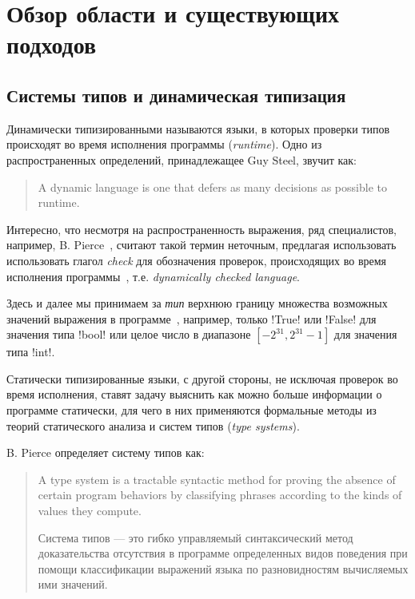 \chapter{Обзор области и существующих подходов}

\section{Системы типов и динамическая типизация}

Динамически типизированными называются языки, в которых проверки типов
происходят во время исполнения программы (\emph{runtime}). Одно из
распространенных определений, принадлежащее Guy Steel, звучит как:

\begin{quote}
  A dynamic language is one that defers as many decisions as possible to
  runtime.
\end{quote}

Интересно, что несмотря на распространенность выражения, ряд специалистов,
например, B. Pierce~\cite{Pierce2002}, считают такой термин неточным, предлагая
использовать использовать глагол \emph{check} для обозначения проверок,
происходящих во время исполнения программы~\cite{Cardelli2004}, т.е.
\emph{dynamically checked language}.


Здесь и далее мы принимаем за \emph{тип} верхнюю границу множества возможных
значений выражения в программе~\cite{Cardelli2004}, например, только !True! или
!False! для значения типа !bool! или целое число в диапазоне 
$[-2^{31}, 2^{31}-1]$ для значения типа !int!.

Статически типизированные языки, с другой стороны, не исключая проверок во время
исполнения, ставят задачу выяснить как можно больше информации о программе
статически, для чего в них применяются формальные методы из теорий статического
анализа и систем типов (\emph{type systems}). 

B. Pierce определяет систему типов как:

\begin{quote}
  A type system is a tractable syntactic method for proving the absence of certain
  program behaviors by classifying phrases according to the kinds of values they
  compute.

  Система типов --- это гибко управляемый синтаксический метод доказательства
  отсутствия в программе определенных видов поведения при помощи классификации
  выражений языка по разновидностям вычисляемых ими значений.
\end{quote}

